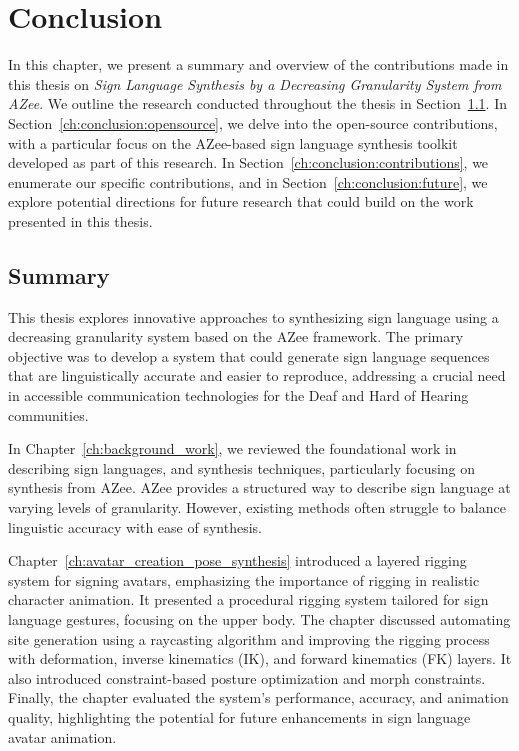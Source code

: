 \documentclass[../../main.tex]{subfiles}
\begin{document}
\chapter{Conclusion}
\label{ch:conclusion}

In this chapter, we present a summary and overview of the contributions made in this thesis on \textit{Sign Language Synthesis by a Decreasing Granularity System from AZee}. We outline the research conducted throughout the thesis in Section~\ref{ch:conclusion:summary}. In Section~\ref{ch:conclusion:opensource}, we delve into the open-source contributions, with a particular focus on the AZee-based sign language synthesis toolkit developed as part of this research. In Section~\ref{ch:conclusion:contributions}, we enumerate our specific contributions, and in Section~\ref{ch:conclusion:future}, we explore potential directions for future research that could build on the work presented in this thesis.

\section{Summary}
\label{ch:conclusion:summary}

This thesis explores innovative approaches to synthesizing sign language using a decreasing granularity system based on the AZee framework. The primary objective was to develop a system that could generate sign language sequences that are linguistically accurate and easier to reproduce, addressing a crucial need in accessible communication technologies for the Deaf and Hard of Hearing communities.

In Chapter~\ref{ch:background_work}, we reviewed the foundational work in describing sign languages, and synthesis techniques, particularly focusing on synthesis from AZee. AZee provides a structured way to describe sign language at varying levels of granularity. However, existing methods often struggle to balance linguistic accuracy with ease of synthesis. 

Chapter~\ref{ch:avatar_creation_pose_synthesis} introduced a layered rigging system for signing avatars, emphasizing the importance of rigging in realistic character animation. It presented a procedural rigging system tailored for sign language gestures, focusing on the upper body. The chapter discussed automating site generation using a raycasting algorithm and improving the rigging process with deformation, inverse kinematics (IK), and forward kinematics (FK) layers. It also introduced constraint-based posture optimization and morph constraints. Finally, the chapter evaluated the system’s performance, accuracy, and animation quality, highlighting the potential for future enhancements in sign language avatar animation. 
\end{document}
